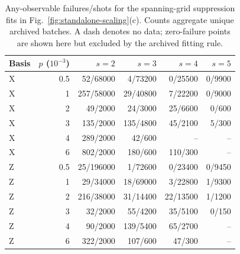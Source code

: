 \begin{table}[t]
\caption{Any-observable failures/shots for the spanning-grid suppression fits in Fig.~\ref{fig:standalone-scaling}(c). Counts aggregate unique archived batches. A dash denotes no data; zero-failure points are shown here but excluded by the archived fitting rule.}
\label{tab:fit-counts}
\centering\small
\setlength{\tabcolsep}{3pt}
\begin{tabular}{@{}lrrrrr@{}}
\toprule
Basis & $p$ ($10^{-3}$) & $s=2$ & $s=3$ & $s=4$ & $s=5$\\
\midrule
X & 0.5 & 52/68000 & 4/73200 & 0/25500 & 0/9900\\
X & 1 & 257/58000 & 29/40800 & 7/22200 & 0/9000\\
X & 2 & 49/2000 & 24/3000 & 25/6600 & 0/600\\
X & 3 & 135/2000 & 135/4800 & 45/2100 & 5/300\\
X & 4 & 289/2000 & 42/600 & -- & --\\
X & 6 & 802/2000 & 180/600 & 110/300 & --\\
\addlinespace
Z & 0.5 & 25/196000 & 1/72600 & 0/23400 & 0/9450\\
Z & 1 & 29/34000 & 18/69000 & 3/22800 & 1/9300\\
Z & 2 & 216/38000 & 31/14400 & 22/13500 & 1/1200\\
Z & 3 & 32/2000 & 55/4200 & 35/5100 & 0/150\\
Z & 4 & 90/2000 & 139/5400 & 65/2700 & --\\
Z & 6 & 322/2000 & 107/600 & 47/300 & --\\
\bottomrule
\end{tabular}
\end{table}
